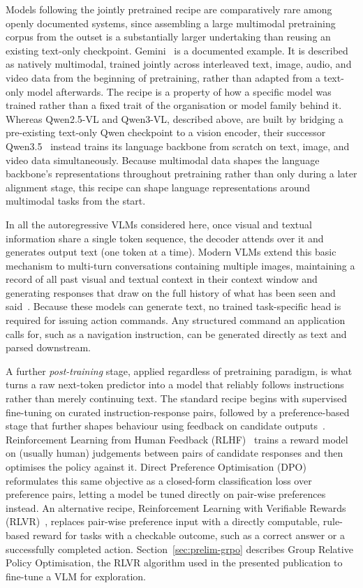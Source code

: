 Models following the jointly pretrained recipe are comparatively rare among openly documented systems, since assembling a large multimodal pretraining corpus from the outset is a substantially larger undertaking than reusing an existing text-only checkpoint. Gemini~\cite{team2023gemini} is a documented example. It is described as natively multimodal, trained jointly across interleaved text, image, audio, and video data from the beginning of pretraining, rather than adapted from a text-only model afterwards. The recipe is a property of how a specific model was trained rather than a fixed trait of the organisation or model family behind it. Whereas Qwen2.5-VL and Qwen3-VL, described above, are built by bridging a pre-existing text-only Qwen checkpoint to a vision encoder, their successor Qwen3.5~\cite{qwenteam2026qwen35omni} instead trains its language backbone from scratch on text, image, and video data simultaneously. Because multimodal data shapes the language backbone's representations throughout pretraining rather than only during a later alignment stage, this recipe can shape language representations around multimodal tasks from the start.

In all the autoregressive VLMs considered here, once visual and textual information share a single token sequence, the decoder attends over it and generates output text (one token at a time). Modern VLMs extend this basic mechanism to multi-turn conversations containing multiple images, maintaining a record of all past visual and textual context in their context window and generating responses that draw on the full history of what has been seen and said~\cite{li2024llavanextinterleavetacklingmultiimagevideo}. Because these models can generate text, no trained task-specific head is required for issuing action commands. Any structured command an application calls for, such as a navigation instruction, can be generated directly as text and parsed downstream.

A further \emph{post-training} stage, applied regardless of pretraining paradigm, is what turns a raw next-token predictor into a model that reliably follows instructions rather than merely continuing text. The standard recipe begins with supervised fine-tuning on curated instruction-response pairs, followed by a preference-based stage that further shapes behaviour using feedback on candidate outputs~\cite{christiano2017deep}. Reinforcement Learning from Human Feedback (RLHF)~\cite{ouyang2022instructgpt} trains a reward model on (usually human) judgements between pairs of candidate responses and then optimises the policy against it. Direct Preference Optimisation (DPO)~\cite{rafailov2023dpo} reformulates this same objective as a closed-form classification loss over preference pairs, letting a model be tuned directly on pair-wise preferences instead. An alternative recipe, Reinforcement Learning with Verifiable Rewards (RLVR)~\cite{shao2024deepseekmath,lambert2024tulu3}, replaces pair-wise preference input with a directly computable, rule-based reward for tasks with a checkable outcome, such as a correct answer or a successfully completed action. Section~\ref{sec:prelim-grpo} describes Group Relative Policy Optimisation, the RLVR algorithm used in the presented publication to fine-tune a VLM for exploration.

